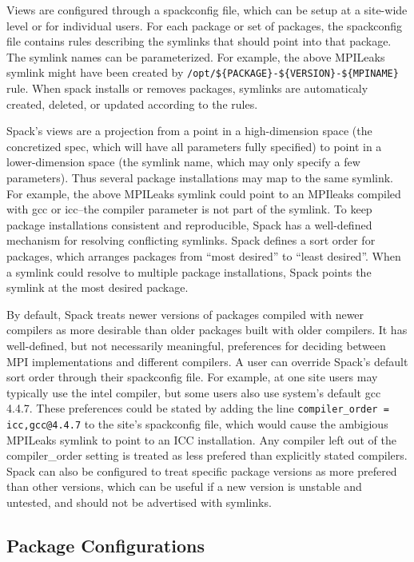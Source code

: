 Views are configured through a spackconfig file, which can be setup at a site-wide level or for individual users.  For each package or set of packages, the spackconfig file contains rules describing the symlinks that should point into that package.  The symlink names can be parameterized.  For example, the above MPILeaks symlink might have been created by {\tt /opt/\$\{PACKAGE\}-\$\{VERSION\}-\$\{MPINAME\} } rule.  When spack installs or removes packages, symlinks are automaticaly created, deleted, or updated according to the rules.  

Spack's views are a projection from a point in a high-dimension space (the concretized spec, which will have all parameters fully specified) to point in a lower-dimension space (the symlink name, which may only specify a few parameters).  Thus several package installations may map to the same symlink.  For example, the above MPILeaks symlink could point to an MPIleaks compiled with gcc or icc--the compiler parameter is not part of the symlink.  To keep  package installations  consistent and reproducible, Spack has a well-defined mechanism for resolving conflicting symlinks.  Spack defines a sort order for packages, which arranges packages from ``most desired'' to ``least desired''.  When a symlink could resolve to multiple package installations, Spack points the symlink at the most desired package.  

By default, Spack treats newer versions of packages compiled with newer compilers as more desirable than older packages built with older compilers.  It has well-defined, but not necessarily meaningful, preferences for deciding between MPI implementations and different compilers.  A user can override Spack's default sort order through their spackconfig file.  For example, at one site users may typically use the intel compiler, but some users also use system's default gcc 4.4.7.  These preferences could be stated by adding the line {\tt compiler\_order = icc,gcc@4.4.7} to the site's spackconfig file, which would cause the ambigious MPILeaks symlink to point to an ICC installation.  Any compiler left out of the compiler\_order setting is treated as less prefered than explicitly stated compilers.  Spack can also be configured to treat specific package versions as more prefered than other versions, which can be useful if a new version is unstable and untested, and should not be advertised with symlinks.  


\subsection{Package Configurations}

